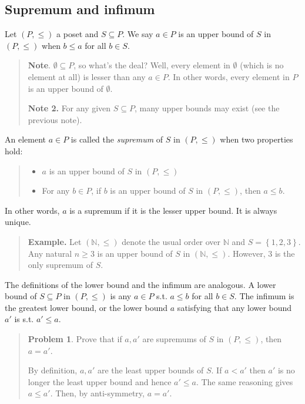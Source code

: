 \documentclass[a4paper, 12pt]{article}
\theoremstyle{definition}
\newtheorem{problem}{Problem}
\theoremstyle{definition}
\theoremstyle{definition}
\begin{document}
\subsection{Supremum and infimum}
Let $(P, \leq) $ a poset and $S \subseteq P$. We say $a \in P$ is an upper bound
of $S$ in $(P, \leq) $ when $b \leq a$ for all $b \in S$. 

\begin{quote}
    \textbf{Note}. $\emptyset \subseteq P$, so what's the deal? Well, every
    element in $\emptyset$ (which is no element at all) is lesser than any $a
    \in P$. In other words, every element in $P$ is an upper bound of
    $\emptyset$.

    \textbf{Note 2.} For any given $S \subseteq P$, many upper bounds may exist
    (see the previous note).
\end{quote}

An element $a \in P$ is called the \textit{supremum} of $S$ in $(P, \leq) $ when
two properties hold: 

\begin{quote}
\begin{itemize}
    \item $a$ is an upper bound of $S$ in $(P, \leq) $ 
    \item For any $b \in P$, if $b$ is an upper bound of $S$ in $(P, \leq) $,
        then $a \leq b$.
\end{itemize}
\end{quote}

In other words, $a$ is a supremum if it is the lesser upper bound. It is always
unique.


\small
\begin{quote}

    \textbf{Example.} Let $(\mathbb{N}, \leq)$ denote the usual order over
    $\mathbb{N}$ and $S = \left\{ 1, 2, 3 \right\} $. Any natural $n \geq 3$ is an upper
    bound of $S$ in $(\mathbb{N}, \leq)$. However, $3$ is the only supremum of
    $S$.

\end{quote}
\normalsize

The definitions of the lower bound and the infimum are analogous. A lower bound
of $S \subseteq P$ in $(P, \leq) $ is any $a \in P$ s.t. $a \leq b$ for all $b
\in S$. The infimum is the greatest lower bound, or the lower bound $a$
satisfying that any lower bound $a'$ is s.t. $a' \leq a$.


\small
\begin{quote}

\begin{problem}
    Prove that if $a, a'$ are supremums of $S$ in $(P, \leq) $, then $a = a'$.
\end{problem}

By definition, $a, a'$ are the least upper bounds of $S$. If $a < a'$ then $a'$
is no longer the least upper bound and hence $a' \leq a$. The same reasoning
gives $a \leq a'$. Then, by anti-symmetry, $a = a'$.

\end{quote}
\normalsize
\end{document}
